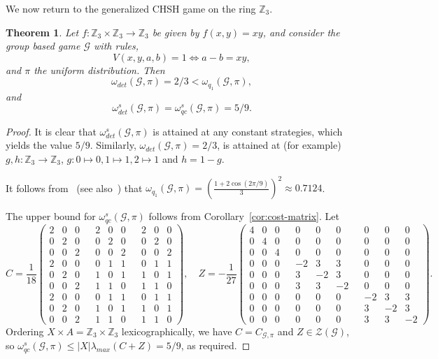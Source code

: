 \documentclass[11pt]{amsart}
\newtheorem{thm}{Theorem}[section]
\theoremstyle{definition}
\newcommand{\bb}[1]{\mathbb{#1}}
\newcommand{\cl}[1]{\mathcal{#1}}
\begin{document}
 We now return to the generalized CHSH game on the ring $\bb Z_3$.

 \begin{thm}
 Let $f: \bb Z_3 \times \bb Z_3 \to \bb Z_3$ be given by $f(x,y) = xy$, and consider the group based game $\cl G$ with rules,
\[ V(x,y,a,b) =1 \iff a -b = xy,\]
and $\pi$ the uniform distribution.
Then
\[\omega_{det}(\cl G, \pi) = 2/3<\omega_{q_1}(\cl G,\pi),\] and
\[\omega^s_{det}(\cl G, \pi) = \omega^s_{qc}(\cl G,\pi)=5/9.\]
\end{thm}
\begin{proof}
It is clear that $\omega_{det}^s(\cl G,\pi)$ is attained at any constant strategies, which yields the value $5/9$.
Similarly, $\omega_{det}(\cl G,\pi)=2/3$, is attained at (for example) $g,h:\bb Z_3\to \bb Z_3$, $g:0\mapsto 0,1\mapsto 1,2\mapsto1$ and $h=1-g$.

It follows from~\cite{JLLNL} (see also~\cite{KSTBSA}) that $\omega_{q_1}(\cl G,\pi)=(\frac{1+2\cos(2\pi/9)}3)^2 %
\approx 0.7124$. %

The upper bound for $\omega_{qc}^s(\cl G,\pi)$ follows from Corollary~\ref{cor:cost-matrix}. Let
\[ C=\frac1{18}\left(
\begin{smallmatrix}
 2 & 0 & 0 && 2 & 0 & 0 && 2 & 0 & 0 \\
 0 & 2 & 0 && 0 & 2 & 0 && 0 & 2 & 0 \\
 0 & 0 & 2 && 0 & 0 & 2 && 0 & 0 & 2 \\[3pt]
 2 & 0 & 0 && 0 & 1 & 1 && 0 & 1 & 1 \\
 0 & 2 & 0 && 1 & 0 & 1 && 1 & 0 & 1 \\
 0 & 0 & 2 && 1 & 1 & 0 && 1 & 1 & 0 \\[3pt]
 2 & 0 & 0 && 0 & 1 & 1 && 0 & 1 & 1 \\
 0 & 2 & 0 && 1 & 0 & 1 && 1 & 0 & 1 \\
 0 & 0 & 2 && 1 & 1 & 0 && 1 & 1 & 0
\end{smallmatrix}\right),\quad Z=-\frac1{27}\left(
\begin{smallmatrix}
 4 & 0 & 0 && 0 & 0 & 0 && 0 & 0 & 0 \\
 0 & 4 & 0 && 0 & 0 & 0 && 0 & 0 & 0 \\
 0 & 0 & 4 && 0 & 0 & 0 && 0 & 0 & 0 \\[3pt]
 0 & 0 & 0 && -2 & 3 & 3 && 0 & 0 & 0 \\
 0 & 0 & 0 && 3 & -2 & 3 && 0 & 0 & 0 \\
 0 & 0 & 0 && 3 & 3 & -2 && 0 & 0 & 0 \\[3pt]
 0 & 0 & 0 && 0 & 0 & 0 && -2 & 3 & 3 \\
 0 & 0 & 0 && 0 & 0 & 0 && 3 & -2 & 3 \\
 0 & 0 & 0 && 0 & 0 & 0 && 3 & 3 & -2
\end{smallmatrix}\right)
.\]
Ordering $X\times A=\bb Z_3\times \bb Z_3$ lexicographically, we have $C=C_{\cl G,\pi}$ and $Z\in \cl Z(\cl G)$, so $\omega_{qc}^s(\cl G,\pi)\le |X|\lambda_{max}(C+Z)=5/9$, as required.
\end{proof}
\end{document}
